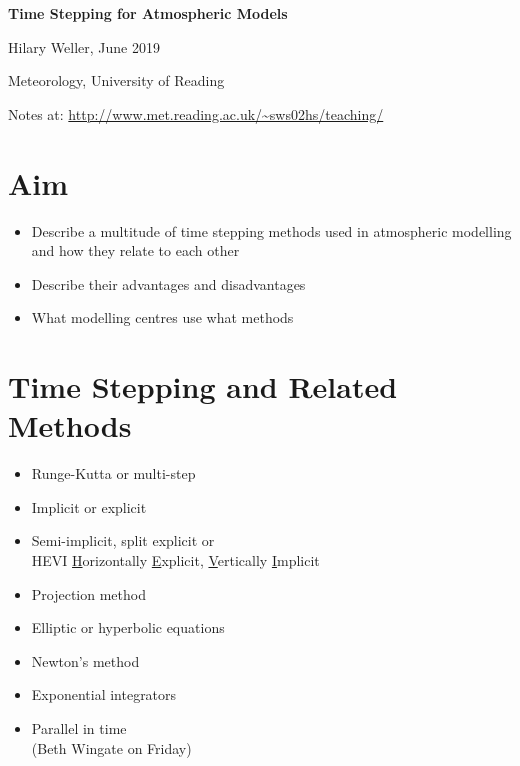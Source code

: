 \begin{center}
\textbf{\large{}Time Stepping for Atmospheric Models}{\large\par}
\par\end{center}

\begin{center}
{\large{}Hilary Weller, June 2019}{\large\par}
\par\end{center}

\begin{center}
Meteorology, University of Reading
\par\end{center}

\begin{center}
Notes at: \url{http://www.met.reading.ac.uk/~sws02hs/teaching/}
\par\end{center}

\clearpage{}

\section*{Aim}
\begin{itemize}
\item Describe a multitude of time stepping methods used in atmospheric
modelling and how they relate to each other
\item Describe their advantages and disadvantages
\item What modelling centres use what methods
\end{itemize}

\section*{Time Stepping and Related Methods}

\begin{multicols}{2}
\begin{itemize}
\item Runge-Kutta or multi-step
\item Implicit or explicit
\item Semi-implicit, split explicit or \\
HEVI \textendash{}\uline{ H}orizontally \uline{E}xplicit, \uline{V}ertically
\uline{I}mplicit
\item Projection method
\item Elliptic or hyperbolic equations
\item Newton's method
\item Exponential integrators
\item Parallel in time\\
(Beth Wingate on Friday)
\end{itemize}
\end{multicols}

